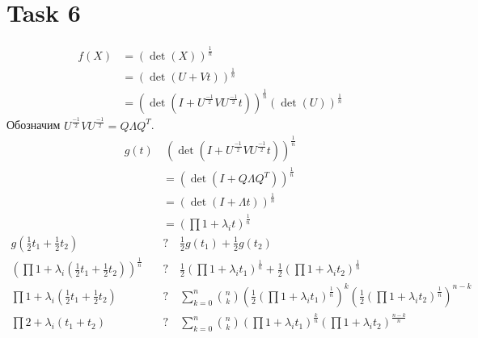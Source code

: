 \documentclass[12pt]{exam}
\begin{document}
\section*{Task 6}
\begin{align*}
    f(X) 
        &= (\det (X))^\frac{1}{n} \\
        &= (\det (U + Vt))^\frac{1}{n} \\
        &= (\det (I + U^\frac{-1}{2} V U^\frac{-1}{2}t))^\frac{1}{n} (\det(U))^\frac{1}{n}  
\end{align*}
Обозначим $U^\frac{-1}{2} V U^\frac{-1}{2} = Q \Lambda Q^T$.
\begin{align*}
    g(t) 
        &~ (\det (I + U^\frac{-1}{2} V U^\frac{-1}{2}t))^\frac{1}{n} \\
        &= (\det (I + Q \Lambda Q^T))^\frac{1}{n} \\
        &= (\det (I + \Lambda t))^\frac{1}{n} \\ 
        &= (\prod 1 + \lambda_i t)^\frac{1}{n}
\end{align*}
\begin{align*}
    g(\frac{1}{2}t_1 + \frac{1}{2}t_2) \quad &? \quad 
    \frac{1}{2} g(t_1) + \frac{1}{2} g(t_2)\\
    \left( \prod 1 + \lambda_i (\frac{1}{2}t_1 + \frac{1}{2}t_2) \right)^\frac{1}{n} \quad &? \quad 
    \frac{1}{2}\left(\prod 1 + \lambda_i t_1\right)^\frac{1}{n} + \frac{1}{2}\left(\prod 1 + \lambda_i t_2\right)^\frac{1}{n}\\ 
    \prod 1 + \lambda_i (\frac{1}{2}t_1 + \frac{1}{2}t_2) \quad &? \quad 
    \sum_{k=0}^n {n \choose k} \left(\frac{1}{2}\left(\prod 1 + \lambda_i t_1\right)^\frac{1}{n} \right)^k \left(\frac{1}{2}\left(\prod 1 + \lambda_i t_2\right)^\frac{1}{n} \right)^{n - k}\\
    \prod 2 + \lambda_i (t_1 + t_2) \quad &? \quad 
    \sum_{k=0}^n {n \choose k} \left(\prod 1 + \lambda_i t_1\right)^\frac{k}{n} \left(\prod 1 + \lambda_i t_2\right)^\frac{n - k}{n}\\
\end{align*}
\end{document}

